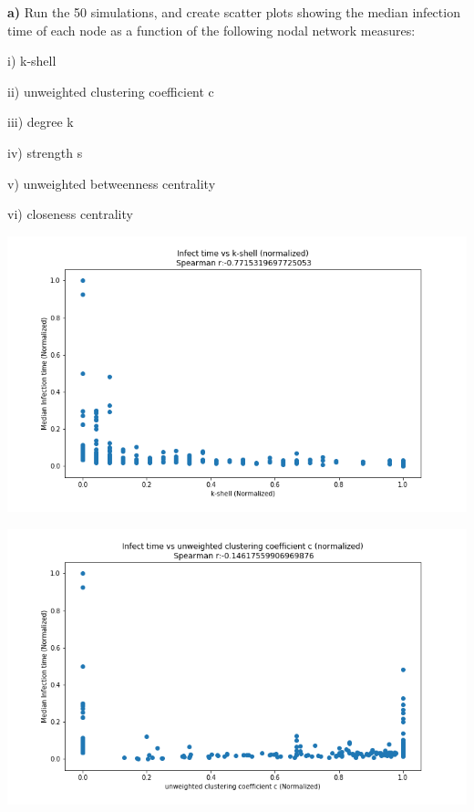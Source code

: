 \documentclass[a4paper,12pt]{article}
\begin{document}
\bigskip
\textbf{a)} Run the 50 simulations, and create scatter plots showing the median infection time
of each node as a function of the following nodal network measures:

i) k-shell

ii) unweighted clustering coefficient c

iii) degree k

iv) strength s

v) unweighted betweenness centrality

vi) closeness centrality

  \begin{minipage}{0.5\textwidth}
    \includegraphics[width=\textwidth]{0}
  \end{minipage}
  \begin{minipage}{0.5\textwidth}
    \includegraphics[width=\textwidth]{1}
  \end{minipage}
\end{document}

